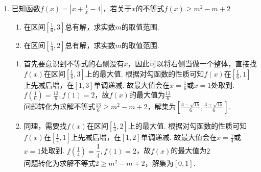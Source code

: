 \begin{enumerate}
\begin{jieda}
\begin{enumerate}
\begin{dingautolist}{172}
            \end{dingautolist}
            \item 将$a$做为主元，即$(x+3)a-2x+x^2 > 0$在$a \in [-1, 1]$恒成立，设$f(a) = (x+3)a-2x+x^2$，故只需$f(1) > 0, f(-1) > 0$即可.解得$x \in (-\infty, \frac{3-\sqrt{21}}{2})\cup(\frac{3+\sqrt{21}}{2}, +\infty)$
        \end{enumerate}
        \ps 恒成立问题，首先考虑主元应该是谁，然后考虑是否要参变分离.
        \end{jieda}
    \begin{vspace_}
    \vsp[6]
    \end{vspace_}
        \item 已知函数$f(x) = |x + \frac{1}{x} - 4|$，若关于$x$的不等式$f(x) \geq m^2-m+2$
        \begin{enumerate}
            \item 在区间$[\frac{1}{6}, 3]$总有解，求实数$m$的取值范围.
            \item 在区间$[\frac{1}{4}, 2]$总有解，求实数$m$的取值范围.
        \end{enumerate}
        \begin{jieda}
            \begin{enumerate}
                \item 首先要意识到不等式的右侧没有$x$，因此可以将右侧当做一个整体，直接找$f(x)$在区间$[\frac{1}{6}, 3]$上的最大值. 根据对勾函数的性质可知$f(x)$在$[\frac{1}{6}, 1]$上先减后增，在$[1, 3]$单调递减. 故最大值会在$x = \frac{1}{6}$或$x = 1$处取到.$f(\frac{1}{6}) = \frac{13}{6}, f(1) = 2$，故$f(x)$的最大值为$\frac{13}{6}$ \\
                问题转化为求解不等式$\frac{13}{6} \geq m^2-m+2$，解集为$[\frac{3-\sqrt{15}}{6}, \frac{3+\sqrt{15}}{6}]$.
                \item 同理，需要找$f(x)$在区间$[\frac{1}{4}, 2]$上的最大值. 根据对勾函数的性质可知$f(x)$在$[\frac{1}{4}, 1]$上先减后增，在$[1, 2]$单调递减. 故最大值会在$x = \frac{1}{4}$或$x = 1$处取到. $f(\frac{1}{4}) = \dfrac{1}{4}, f(1) = 2$，故$f(x)$的最大值为$2$ \\
                问题转化为求解不等式$2 \geq m^2-m+2$，解集为$[0, 1]$.
            \end{enumerate}
        \end{jieda}
    \begin{vspace_}
    \vsp[5]
    \end{vspace_}
\end{enumerate}